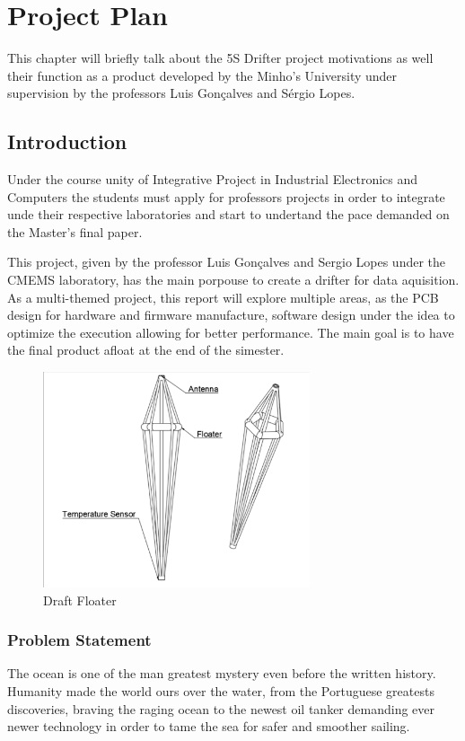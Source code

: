 \chapter{Project Plan}
    This chapter will briefly talk about the 5S Drifter project motivations as well their function as a product developed 
    by the Minho's University under supervision by the professors Luis Gonçalves and Sérgio Lopes.
\section{Introduction}
Under the course unity of Integrative Project in Industrial Electronics and Computers the students must
apply for professors projects in order to integrate unde their respective laboratories and start to undertand the pace
demanded on the Master's final paper.

This project, given by the professor Luis Gonçalves and Sergio Lopes under the CMEMS laboratory,
has the main porpouse to create a drifter for data aquisition. As a multi-themed project, this report will
explore multiple areas, as the PCB design for hardware and firmware manufacture, software design under the idea to optimize
the execution allowing for better performance. The main goal is to have the final product afloat at the end of the simester.

\begin{figure}[H]
    \centering
    \includegraphics[width=0.7\textwidth]{images/diagrams/shell/unnamed.png}  %
    \caption{Draft Floater}
    \label{fig:Draft Floater}        
\end{figure}

\subsection{Problem Statement}
The ocean is one of the man greatest mystery even before the written history. Humanity made the world ours over the water, 
from the Portuguese greatests discoveries, braving the raging ocean to the newest oil tanker demanding ever newer technology
in order to tame the sea for safer and smoother sailing.

